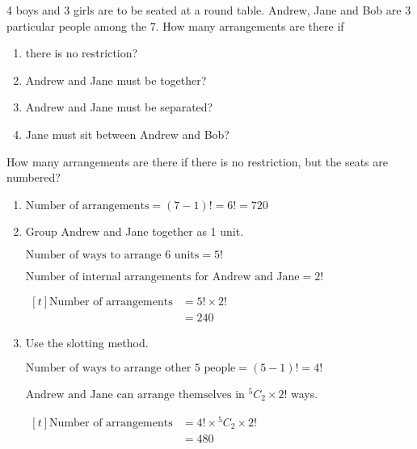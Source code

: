 \documentclass[11pt,a4paper]{book}
\begin{document}
\begin{example}

4 boys and 3 girls are to be seated at a round table. Andrew, Jane
and Bob are 3 particular people among the 7. How many arrangements
are there if

\begin{enumerate}[label=(\alph*)] 

\item there is no restriction?

\item Andrew and Jane must be together?

\item Andrew and Jane must be separated?

\item Jane must sit between Andrew and Bob?

\end{enumerate}

How many arrangements are there if there is no restriction, but the
seats are numbered?

\Solution

\begin{enumerate}[label=(\alph*)] 

\item  $\text{Number of arrangements}=\left(7-1\right)!=6!=720$

\item  Group Andrew and Jane together as 1 unit.

$\text{Number of ways to arrange 6 units}=5!$

$\text{Number of internal arrangements for Andrew and Jane}=2!$

$
\begin{aligned}[t]
\text{Number of arrangements} & =5!\times2!\\
 & =240
\end{aligned}
$

\item \begin{minipage}[t]{.6\textwidth}

Use the slotting method.

$\text{Number of ways to arrange other 5 people}=\left(5-1\right)!=4!$

$\text{Andrew and Jane can arrange themselves in }{}^{5}C_{2}\times2!$ ways.

$
\begin{aligned}[t]
\text{Number of arrangements} & =4!\times{}^{5}C_{2}\times2!\\
 & =480
\end{aligned}
$


\end{minipage}
\end{enumerate}
\end{example}
\end{document}

